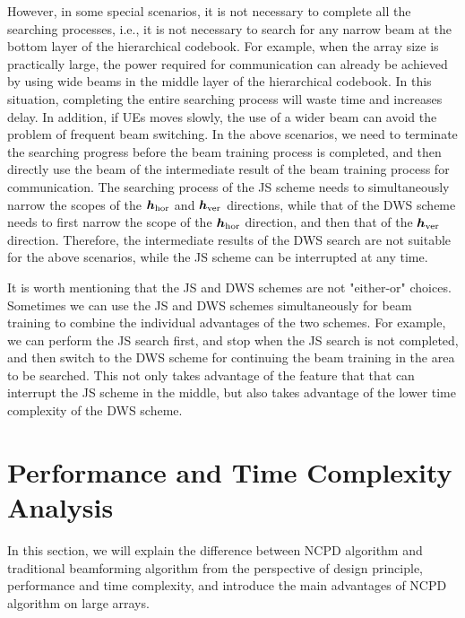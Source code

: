 \documentclass[12pt,draftclsnofoot,onecolumn]{IEEEtran}
\begin{document}
	However, in some special scenarios, it is not necessary  to complete all the searching processes, i.e., it is not necessary to search for any narrow beam at the bottom layer of the hierarchical codebook. For example, when the array size is practically large, the power required for communication can already be achieved by using  wide beams in the middle layer of the hierarchical codebook. In this situation, completing the entire searching process will waste time and increases delay. In addition, if  UEs moves slowly, the use of a wider beam can avoid the problem of frequent beam switching. In the above scenarios, we need to terminate the searching progress before the beam training process is completed, and then directly use the beam of the intermediate result of the beam training process  for communication. The searching process of the JS scheme needs to simultaneously narrow the scopes of the ${\bm h}_{\rm hor}$ and ${\bm h}_{\rm ver}$ directions, while that of the DWS scheme needs to first narrow the scope of the ${\bm h}_{\rm hor}$ direction, and then that of the ${\bm h}_{\rm ver}$ direction. Therefore, the intermediate results of the DWS search are not suitable for the above scenarios, while the  JS scheme can be interrupted at any time.
	
	It is worth mentioning that the JS and DWS schemes are not "either-or" choices. Sometimes we can use the JS and DWS schemes simultaneously for beam training to combine the individual advantages of the two schemes.  For example, we can perform the JS search first, and stop when the JS search is not completed, and then switch to the DWS scheme for continuing the beam training in the area to be searched. This not only takes advantage of the feature that that can interrupt the JS scheme  in the middle, but also takes advantage of the lower time complexity of the DWS scheme.
	
	\section{Performance and Time Complexity Analysis }
		In this section, we will explain the difference between NCPD algorithm and traditional beamforming algorithm from the perspective of design principle, performance and time complexity, and introduce the main advantages of NCPD algorithm on large arrays.
		
\end{document}
